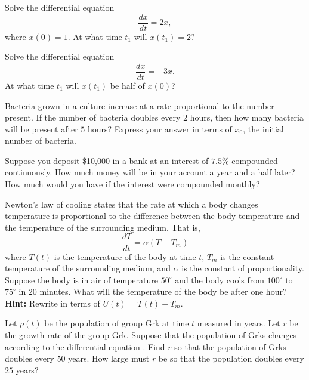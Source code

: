 \begin{exercise} \label{c3.1.1}
Solve the differential equation
\[
\frac{dx}{dt} = 2x,
\]
where $x(0)=1$.  At what time $t_1$ will $x(t_1)=2$?
\end{exercise}

\begin{exercise} \label{c3.1.2}
Solve the differential equation
\[
\frac{dx}{dt} = -3x.
\]
At what time $t_1$ will $x(t_1)$ be half of $x(0)$?
\end{exercise}

\begin{exercise} \label{c3.1.3}
Bacteria grown in a culture increase at a rate proportional to the
number present.  If the number of bacteria doubles every $2$ hours,
then how many bacteria will be pre\-sent af\-ter $5$ hours?  Express
your answer in terms of $x_0$, the initial number of bacteria.
\end{exercise}

\begin{exercise} \label{c3.1.4}
Suppose you deposit \$10,000 in a bank at an
interest of $7.5\%$ compounded continuously.
How much money will be in your account a year and a half later?
How much would you have if the interest were compounded monthly?
\end{exercise}

\begin{exercise} \label{c3.1.5} 
Newton's law of cooling states that the rate at which a body changes
temperature is proportional to the difference between the body
temperature and the temperature of the surrounding medium.  That is,
\begin{equation}  \label{e:Newton}
\frac{dT}{dt} = \alpha(T-T_m)
\end{equation}
where $T(t)$ is the temperature of the body at time $t$, $T_m$ is the
constant temperature of the surrounding medium, and $\alpha$ is the
constant of proportionality.  Suppose the
body is in air of temperature $50^\circ$ and the body cools from
$100^\circ$ to $75^\circ$ in $20$ minutes.  What will the temperature
of the body be after one hour?  {\bf Hint:} Rewrite  in
terms of $U(t) = T(t) - T_m$.
\end{exercise}

\begin{exercise} \label{c3.1.6}
Let $p(t)$ be the population of group Grk at time $t$ measured in years.
Let $r$ be the growth rate of the group Grk.  Suppose that the population
of Grks changes according to the differential equation .
Find $r$ so that the population of Grks doubles every $50$ years.  How
large must $r$ be so that the population doubles every $25$ years?
\end{exercise}

